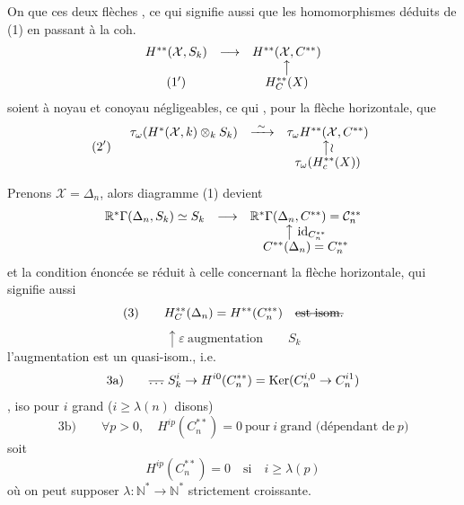 \documentclass[11pt,a4paper]{article}
\begin{document}
On   que ces deux flèches  , ce qui signifie aussi que les homomorphismes déduits de (1) en passant à la coh.
\[
\begin{array}{ccc}
H^{**}(\mathcal{X}, S_k) & \longrightarrow & H^{**}(\mathcal{X}, C^{**}) \\
 & & \big\uparrow \\
(1') & & H^{**}_{C}(X)
\end{array}
\]
soient à noyau et conoyau négligeables, ce qui   , pour la flèche horizontale, que
\[
(2') \quad
\begin{array}{ccc}
\tau_{\omega}(H^{*}(\mathcal{X}, k) \otimes_k S_k) & \xrightarrow{\ \sim\ } & \tau_{\omega} H^{**}(\mathcal{X}, C^{**}) \\
 & & \big\uparrow \wr \\
 & & \tau_{\omega}(H^{**}_{c}(X))
\end{array}
\]

Prenons $\mathcal{X} = \Delta_n$, alors   diagramme (1) devient
\[
\begin{array}{ccc}
\mathbb{R}^{*}\Gamma(\Delta_n, S_k) \simeq S_k & \longrightarrow & \mathbb{R}^{*}\Gamma(\Delta_n, C^{**}) = \mathcal{C}^{**}_{n} \\
 & & \big\uparrow \ \mathrm{id}_{C^{**}_{n}} \\
 & & C^{**}(\Delta_n) = C^{**}_{n}
\end{array}
\]
et la condition énoncée se réduit à celle concernant la flèche horizontale, qui signifie aussi
\[
(3) \qquad
H^{**}_{C}(\Delta_n) = H^{**}(C^{**}_{n})
\quad
\text{\struck{est isom.}}
\]
\[
\uparrow \varepsilon \ \text{augmentation}
\qquad
S_k
\]
l'augmentation est un quasi-isom., i.e.
\[
\text{3a)} \qquad
\text{\struck{$\ldots$}}\ S^{i}_{k} \to H^{i0}(C^{**}_{n})
= \mathrm{Ker}(C^{i,0}_{n} \to C^{i1}_{n})
\]
\ill{} \ill{}, iso pour $i$ grand ($i \geqslant \lambda(n)$ disons)
\[
\text{3b)} \qquad
\forall p > 0, \quad H^{ip}(C^{**}_{n}) = 0
\ \text{pour}\ i\ \text{grand (dépendant de}\ p\text{)}
\]
soit
\[
H^{ip}(C^{**}_{n}) = 0 \quad \text{si} \quad i \geqslant \lambda(p)
\]
où on peut supposer $\lambda : \mathbb{N}^{*} \to \mathbb{N}^{*}$ strictement croissante.
\end{document}
